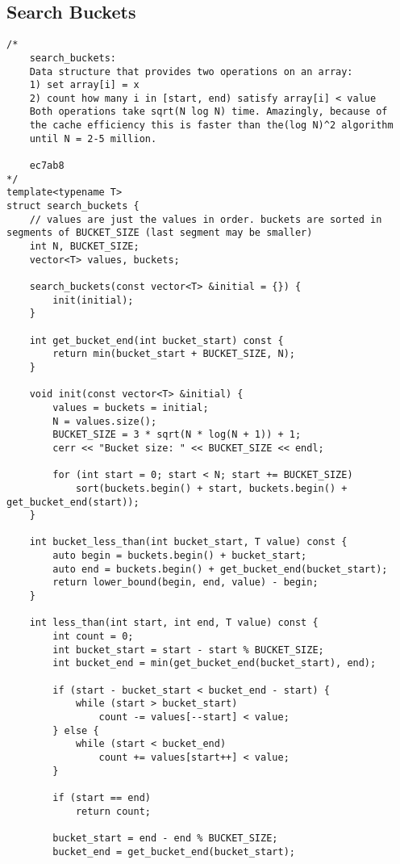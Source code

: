 \documentclass{article}
\begin{document}
\subsection{Search Buckets}
\begin{verbatim}
/*  
    search_buckets:
    Data structure that provides two operations on an array:
    1) set array[i] = x
    2) count how many i in [start, end) satisfy array[i] < value
    Both operations take sqrt(N log N) time. Amazingly, because of 
    the cache efficiency this is faster than the(log N)^2 algorithm 
    until N = 2-5 million.
    
    ec7ab8
*/
template<typename T>
struct search_buckets {
    // values are just the values in order. buckets are sorted in segments of BUCKET_SIZE (last segment may be smaller)
    int N, BUCKET_SIZE;
    vector<T> values, buckets;

    search_buckets(const vector<T> &initial = {}) {
        init(initial);
    }

    int get_bucket_end(int bucket_start) const {
        return min(bucket_start + BUCKET_SIZE, N);
    }

    void init(const vector<T> &initial) {
        values = buckets = initial;
        N = values.size();
        BUCKET_SIZE = 3 * sqrt(N * log(N + 1)) + 1;
        cerr << "Bucket size: " << BUCKET_SIZE << endl;

        for (int start = 0; start < N; start += BUCKET_SIZE)
            sort(buckets.begin() + start, buckets.begin() + get_bucket_end(start));
    }

    int bucket_less_than(int bucket_start, T value) const {
        auto begin = buckets.begin() + bucket_start;
        auto end = buckets.begin() + get_bucket_end(bucket_start);
        return lower_bound(begin, end, value) - begin;
    }

    int less_than(int start, int end, T value) const {
        int count = 0;
        int bucket_start = start - start % BUCKET_SIZE;
        int bucket_end = min(get_bucket_end(bucket_start), end);

        if (start - bucket_start < bucket_end - start) {
            while (start > bucket_start)
                count -= values[--start] < value;
        } else {
            while (start < bucket_end)
                count += values[start++] < value;
        }

        if (start == end)
            return count;

        bucket_start = end - end % BUCKET_SIZE;
        bucket_end = get_bucket_end(bucket_start);


\end{verbatim}
\end{document}
